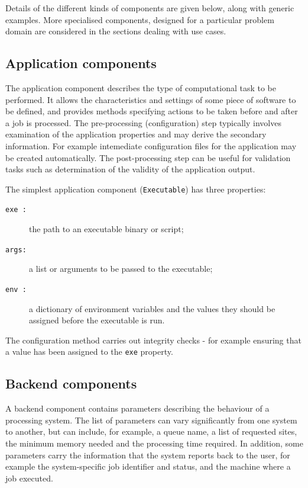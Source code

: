 \documentclass{elsart}
\newcommand{\code}[1]{\texttt{#1}}
\begin{document}
Details of the different kinds of components are given below, along with
generic examples. More specialised components, designed for a particular
problem domain are considered in the sections dealing with use cases.

\subsection{Application components}

The application component describes the type of computational task to be
performed.  It allows the characteristics and settings of some
piece of software to be defined, and provides methods specifying
actions to be taken before and after a job is processed.  The
pre-processing (configuration) step typically involves examination of
the application properties and may derive the secondary
information. For example intemediate configuration files for the
application may be created automatically. The post-processing step can
be useful for validation tasks such as determination of the validity
of the application output.

The simplest application component (\texttt{Executable}) has three properties:
\begin{description}
\item[\code{exe :}] the path to an executable binary or script;
\item[\code{args:}] a list or arguments to be passed to the executable;
\item[\code{env :}] a dictionary of environment variables and the values they
  should be assigned before the executable is run.
\end{description}
The configuration method carries out integrity checks - for example
ensuring that a value has been assigned to the \code{exe} property.

\subsection{Backend components}
A backend component contains parameters describing the
behaviour of a processing system. The list of
parameters can vary significantly from one system to another, but can include,
for example, a queue name, a list of requested sites, the minimum memory
needed and the processing time required. In addition, some parameters carry the
information that the system reports back to the user, for example the 
system-specific job identifier and status, and the machine where a
job executed.
\end{document}
